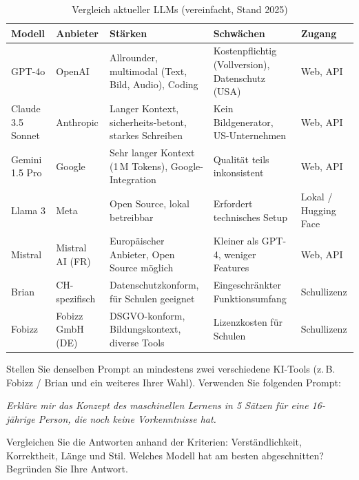 \begin{table}[H]
\centering
\caption{Vergleich aktueller LLMs (vereinfacht, Stand 2025)}
\label{tab:llm-vergleich}
\small
\begin{tabular}{p{2.2cm}p{2cm}p{3.5cm}p{3.5cm}p{2cm}}
    \toprule
    \textbf{Modell}     & \textbf{Anbieter} & \textbf{Stärken}                                         & \textbf{Schwächen}                              & \textbf{Zugang}      \\
    \midrule
    GPT-4o              & OpenAI            & Allrounder, multimodal (Text, Bild, Audio), Coding        & Kostenpflichtig (Vollversion), Datenschutz (USA)& Web, API             \\
    \midrule
    Claude 3.5 Sonnet   & Anthropic         & Langer Kontext, sicherheits-betont, starkes Schreiben     & Kein Bildgenerator, US-Unternehmen              & Web, API             \\
    \midrule
    Gemini 1.5 Pro      & Google            & Sehr langer Kontext (1\,M Tokens), Google-Integration     & Qualität teils inkonsistent                     & Web, API             \\
    \midrule
    Llama 3             & Meta              & Open Source, lokal betreibbar                            & Erfordert technisches Setup                     & Lokal / Hugging Face \\
    \midrule
    Mistral             & Mistral AI (FR)   & Europäischer Anbieter, Open Source möglich                & Kleiner als GPT-4, weniger Features             & Web, API             \\
    \midrule
    Brian               & CH-spezifisch     & Datenschutzkonform, für Schulen geeignet                 & Eingeschränkter Funktionsumfang                 & Schullizenz          \\
    \midrule
    Fobizz              & Fobizz GmbH (DE)  & DSGVO-konform, Bildungskontext, diverse Tools             & Lizenzkosten für Schulen                        & Schullizenz          \\
    \bottomrule
\end{tabular}
\end{table}

\begin{myexercise}
Stellen Sie denselben Prompt an mindestens zwei verschiedene KI-Tools (z.\,B.
Fobizz / Brian und ein weiteres Ihrer Wahl). Verwenden Sie folgenden Prompt:

\begin{center}
    \textit{Erkläre mir das Konzept des maschinellen Lernens in 5 Sätzen für
    eine 16-jährige Person, die noch keine Vorkenntnisse hat.}
\end{center}

Vergleichen Sie die Antworten anhand der Kriterien: Verständlichkeit,
Korrektheit, Länge und Stil. Welches Modell hat am besten abgeschnitten?
Begründen Sie Ihre Antwort.
\end{myexercise}

